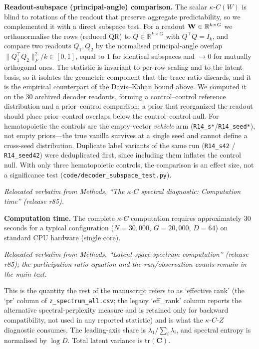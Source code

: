 \documentclass[11 pt,a4 paper]{article}
\begin{document}
\textbf{Readout-subspace (principal-angle) comparison.} The scalar $\kappa$-$C(W)$ is blind to rotations of the readout that preserve aggregate predictability, so we complemented it with a direct subspace test. For a readout $\mathbf{W}\in\mathbb{R}^{k\times G}$ we orthonormalise the rows (reduced QR) to $Q\in\mathbb{R}^{k\times G}$ with $Q^\top Q=I_k$, and compare two readouts $Q_1,Q_2$ by the normalised principal-angle overlap $\|Q_1^\top Q_2\|_F^2/k\in[0,1]$, equal to $1$ for identical subspaces and $\to 0$ for mutually orthogonal ones. The statistic is invariant to per-row scaling and to the latent basis, so it isolates the geometric component that the trace ratio discards, and it is the empirical counterpart of the Davis--Kahan bound above. We computed it on the $30$ archived decoder readouts, forming a control--control reference distribution and a prior--control comparison; a prior that reorganized the readout should place prior--control overlaps below the control--control null. For hematopoietic the controls are the empty-vector \emph{vehicle} arm (\texttt{R14\_s*}/\texttt{R14\_seed*}), not empty priors---the true vanilla survives at a single seed and cannot define a cross-seed distribution. Duplicate label variants of the same run (\texttt{R14\_s42} / \texttt{R14\_seed42}) were deduplicated first, since including them inflates the control null. With only three hematopoietic controls, the comparison is an effect size, not a significance test (\texttt{code/decoder\_subspace\_test.py}).

\noindent\emph{Relocated verbatim from Methods, ``The $\kappa$-$C$ spectral diagnostic: Computation time'' (release r85).}

\textbf{Computation time.} The complete $\kappa$-$C$ computation requires approximately 30 seconds for a typical configuration ($N=30,000$, $G=20,000$, $D=64$) on standard CPU hardware (single core).

\noindent\emph{Relocated verbatim from Methods, ``Latent-space spectrum computation'' (release r85); the participation-ratio equation and the run/observation counts remain in the main text.}

This is the quantity the rest of the manuscript refers to as `effective rank' (the `pr' column of \texttt{z\_spectrum\_all.csv}; the legacy `eff\_rank' column reports the alternative spectral-perplexity measure and is retained only for backward compatibility, not used in any reported statistic) and is what the $\kappa$-$C$-$Z$ diagnostic consumes. The leading-axis share is $\lambda_1 / \sum_i \lambda_i$, and spectral entropy is normalised by $\log D$. Total latent variance is $\mathrm{tr}(\mathbf{C})$.
\end{document}

